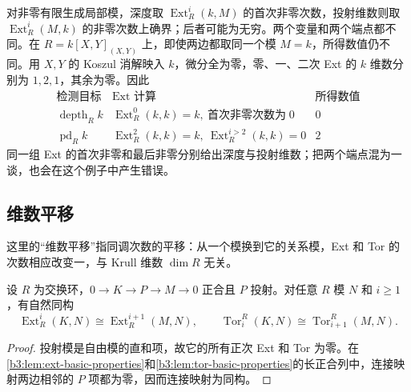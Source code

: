 \ProseParagraphBreak
对非零有限生成局部模，深度取 \(\operatorname{Ext}_R^i(k,M)\) 的首次非零次数，投射维数则取 \(\operatorname{Ext}_R^i(M,k)\) 的非零次数上确界；后者可能为无穷。两个变量和两个端点都不同。在 \(R=k[X,Y]_{(X,Y)}\) 上，即使两边都取同一个模 \(M=k\)，所得数值仍不同。用 \(X,Y\) 的 Koszul 消解映入 \(k\)，微分全为零，零、一、二次 Ext 的 \(k\) 维数分别为 \(1,2,1\)，其余为零。因此
\[
	\begin{array}{c|c|c}
		\text{检测目标}&\text{Ext 计算}&\text{所得数值}\\\hline \operatorname{depth}_Rk&\operatorname{Ext}_R^0(k,k)=k, \ \text{首次非零次数为}\;0&0\\
		\operatorname{pd}_Rk&\operatorname{Ext}_R^2(k,k)=k, \ \operatorname{Ext}_R^{i>2}(k,k)=0&2
	\end{array}
\]
同一组 Ext 的首次非零和最后非零分别给出深度与投射维数；把两个端点混为一谈，也会在这个例子中产生错误。

\subsection{维数平移}
\label{b3:subsec:1702:03}

这里的“维数平移”指同调次数的平移：从一个模换到它的关系模，Ext 和 Tor 的次数相应改变一，与 Krull 维数 \(\dim R\) 无关。

\begin{proposition}\label{b3:prop:dimension-shifting-local}
	设 \(R\) 为交换环，\(0\rightarrow K\rightarrow P\rightarrow M\rightarrow0\) 正合且 \(P\) 投射。对任意 \(R\) 模 \(N\) 和 \(i\ge1\)，有自然同构
	\[
		\operatorname{Ext}_R^i(K,N)\cong\operatorname{Ext}_R^{i+1}(M,N), \qquad \operatorname{Tor}_i^R(K,N)\cong\operatorname{Tor}_{i+1}^R(M,N).
	\]
\end{proposition}
\begin{proof}
	投射模是自由模的直和项，故它的所有正次 Ext 和 Tor 为零。在\cref{b3:lem:ext-basic-properties}和\cref{b3:lem:tor-basic-properties}的长正合列中，连接映射两边相邻的 \(P\) 项都为零，因而连接映射为同构。
\end{proof}

